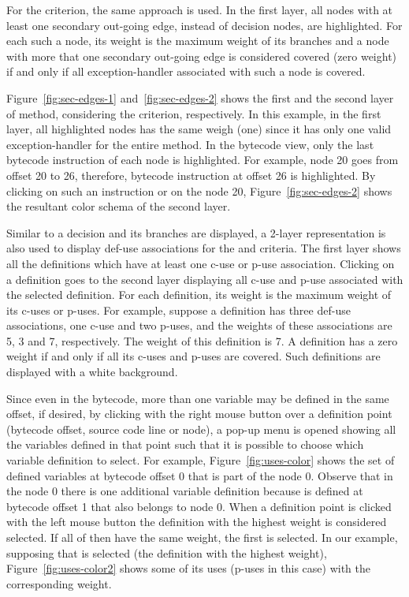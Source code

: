 

For the  criterion, the same approach is used.
In the first layer, all nodes with at least one secondary
out-going edge, instead of decision nodes, are highlighted. For
each such a node, its weight is the maximum weight of its branches
and a node with more that one secondary out-going edge is
considered covered (zero weight) if and only if all
exception-handler associated with such a node is covered.

Figure~\ref{fig:sec-edges-1} and~\ref{fig:sec-edges-2} shows the
first and the second layer of  method,
considering the  criterion, respectively. In
this example, in the first layer, all highlighted nodes has the
same weigh (one) since it has only one valid exception-handler for
the entire method. In the bytecode view, only the last bytecode
instruction of each node is highlighted. For example, node 20 goes
from offset 20 to 26, therefore, bytecode instruction at offset 26
is highlighted. By clicking on such an instruction or on the \DUG
node 20, Figure~\ref{fig:sec-edges-2} shows the resultant color
schema of the second layer.





Similar to a decision and its branches are displayed, a 2-layer
representation is also used to display def-use associations for
the  and  criteria. The first
layer shows all the definitions which have at least one c-use or
p-use association. Clicking on a definition goes to the second
layer displaying all c-use and p-use associated with the selected
definition. For each definition, its weight is the maximum weight
of its c-uses or p-uses. For example, suppose a definition has
three def-use associations, one c-use and two p-uses, and the
weights of these associations are 5, 3 and 7, respectively. The
weight of this definition is 7. A definition has a zero weight if
and only if all its c-uses and p-uses are covered. Such
definitions are displayed with a white background.

Since even in the bytecode, more than one variable may be defined
in the same offset, if desired, by clicking with the right mouse
button over a definition point (bytecode offset, source code line
or \DUG node), a pop-up menu is opened showing all the variables
defined in that point such that it is possible to choose which
variable definition to select. For example,
Figure~\ref{fig:uses-color} shows the set of defined variables at
bytecode offset 0 that is part of the \DUG node 0. Observe that in
the \DUG node 0 there is one additional variable definition
because  is defined at bytecode offset 1 that also
belongs to \DUG node 0. When a definition point is clicked with
the left mouse button the definition with the highest weight is
considered selected. If all of then have the same weight, the
first is selected. In our example, supposing that  is selected (the definition with the highest weight),
Figure~\ref{fig:uses-color2} shows some of its uses (p-uses in
this case) with the corresponding weight.


